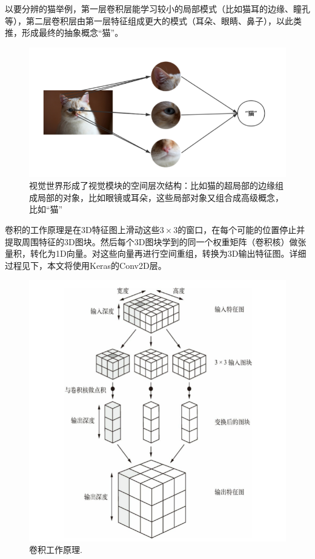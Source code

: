 \documentclass[lang=cn,11pt]{elegantpaper}
\begin{document}
以要分辨的猫举例，第一层卷积层能学习较小的局部模式（比如猫耳的边缘、瞳孔等），第二层卷积层由第一层特征组成更大的模式（耳朵、眼睛、鼻子），以此类推，形成最终的抽象概念“猫”。

\begin{figure}[hbtp]
	\centering
  \includegraphics{cat1}
  \caption{视觉世界形成了视觉模块的空间层次结构：比如猫的超局部的边缘组成局部的对象，比如眼镜或耳朵，这些局部对象又组合成高级概念，比如“猫”\label{fig:cat1}}
\end{figure}

卷积的工作原理是在3D特征图上滑动这些$3\times 3$的窗口，在每个可能的位置停止并提取周围特征的3D图块。然后每个3D图块学到的同一个权重矩阵（卷积核）做张量积，转化为1D向量。对这些向量再进行空间重组，转换为3D输出特征图。详细过程见下，本文将使用Keras的Conv2D层。

\begin{figure}[hbtp]
	\centering
  \includegraphics{conv1.png}
  \caption{卷积工作原理.\label{fig:conv1}}
\end{figure}
\end{document}
